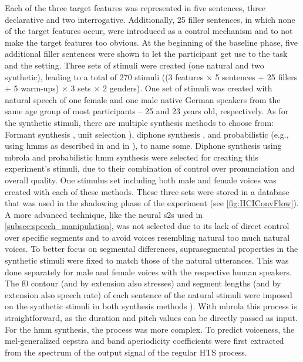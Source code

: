Each of the three target features was represented in five sentences, three declarative and two interrogative.
Additionally, 25 filler sentences, in which none of the target features occur, were introduced as a control mechanism and to not make the target features too obvious.
At the beginning of the baseline phase, five additional filler sentences were shown to let the participant get use to the task and the setting.
Three sets of stimuli were created (one natural and two synthetic), leading to a total of 270 stimuli ((3 features $\times$ 5 sentences + 25 fillers + 5 warm-ups) $\times$ 3 sets $\times$ 2 genders).
One set of stimuli was created with natural speech of one female and one male native German speakers from the same age group of most participants -- 25 and 23 years old, respectively.
As for the synthetic stimuli, there are multiple synthesis methods to choose from:
Formant synthesis \citep[e.g.,][]{Burkhardt2000verification}, unit selection \citep{Hunt1996unit,Black2003unit}), diphone synthesis \citep[e.g.,][]{Dutoit1996mbrola}, and probabilistic (e.g., using \acp{hmm} as described in \citet{Zen2005overview} and in \citet{Zen2009statistical}), to name some.
Diphone synthesis using \acl{mbrola} \citep[\acs{mbrola};][]{Dutoit1996mbrola} and probabilistic \ac{hmm} synthesis were selected for creating this experiment's stimuli, due to their combination of control over pronunciation and overall quality.
One stimulus set including both male and female voices was created with each of these methods.
These three sets were stored in a database that was used in the shadowing phase of the experiment (see \cref{fig:HCIConvFlow}).
A more advanced technique, like the neural \ac{s2s} used in \cref{subsec:speech_manipulation}, was not selected due to its lack of direct control over specific segments and to avoid voices resembling natural too much natural voices.
To better focus on segmental differences, suprasegmental properties in the synthetic stimuli were fixed to match those of the natural utterances.
This was done separately for male and female voices with the respective human speakers.
The \ac{f0} contour (and by extension also stresses) and segment lengths (and by extension also speech rate) of each sentence of the natural stimuli were imposed on the synthetic stimuli in both synthesis methods \citep[and see][]{Raveh2017ESSV}).
With \ac{mbrola} this process is straightforward, as the duration and pitch values can be directly passed as input.
For the \ac{hmm} synthesis, the process was more complex.
To predict voiceness, the mel-generalized cepstra and band aperiodicity coefficients were first extracted from the spectrum of the output signal of the regular HTS process.
